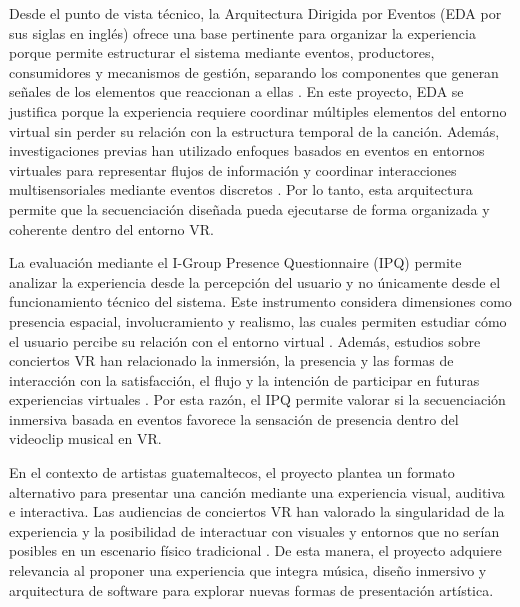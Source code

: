 Desde el punto de vista técnico, la Arquitectura Dirigida por Eventos (EDA por sus siglas en inglés) ofrece una base pertinente para organizar la experiencia porque permite estructurar el sistema mediante eventos, productores, consumidores y mecanismos de gestión, separando los componentes que generan señales de los elementos que reaccionan a ellas \cite{oberhauser2023vr}. En este proyecto, EDA se justifica porque la experiencia requiere coordinar múltiples elementos del entorno virtual sin perder su relación con la estructura temporal de la canción. Además, investigaciones previas han utilizado enfoques basados en eventos en entornos virtuales para representar flujos de información y coordinar interacciones multisensoriales mediante eventos discretos \cite{oberhauser2023vr, edmunds2006mixed}. Por lo tanto, esta arquitectura permite que la secuenciación diseñada pueda ejecutarse de forma organizada y coherente dentro del entorno VR.

La evaluación mediante el I-Group Presence Questionnaire (IPQ) permite analizar la experiencia desde la percepción del usuario y no únicamente desde el funcionamiento técnico del sistema. Este instrumento considera dimensiones como presencia espacial, involucramiento y realismo, las cuales permiten estudiar cómo el usuario percibe su relación con el entorno virtual \cite{berkman2021igroup}. Además, estudios sobre conciertos VR han relacionado la inmersión, la presencia y las formas de interacción con la satisfacción, el flujo y la intención de participar en futuras experiencias virtuales \cite{onderdijk2023concert,lo2023immersive, lee2023viewing}. Por esta razón, el IPQ permite valorar si la secuenciación inmersiva basada en eventos favorece la sensación de presencia dentro del videoclip musical en VR.

En el contexto de artistas guatemaltecos, el proyecto plantea un formato alternativo para presentar una canción mediante una experiencia visual, auditiva e interactiva. Las audiencias de conciertos VR han valorado la singularidad de la experiencia y la posibilidad de interactuar con visuales y entornos que no serían posibles en un escenario físico tradicional \cite{onderdijk2023concert}. De esta manera, el proyecto adquiere relevancia al proponer una experiencia que integra música, diseño inmersivo y arquitectura de software para explorar nuevas formas de presentación artística.
